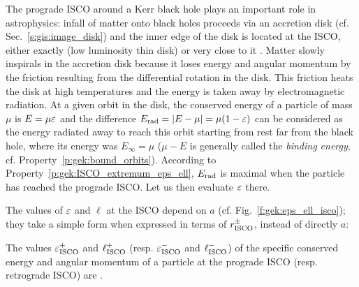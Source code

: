 The prograde ISCO around a Kerr black hole plays an important role in astrophysics:
infall of matter onto black holes proceeds via an accretion disk (cf. Sec.~\ref{s:gis:image_disk}) and
the inner edge of the disk is located at the ISCO, either exactly (low luminosity thin disk)
or very close to it \cite{AbramF13,King23,RezzoZ13}.
Matter slowly inspirals in the accretion disk because it loses energy and angular momentum
by the friction resulting from the differential rotation in the disk. This friction heats the disk at high temperatures and the energy is taken away by electromagnetic radiation. At a given orbit in the disk,
the conserved energy of a particle of mass $\mu$ is $E = \mu \varepsilon$ and the
difference $E_{\rm rad}=|E - \mu|=\mu(1 - \varepsilon)$ can be considered as the energy radiated away to reach this
orbit starting from rest far from the
black hole, where its energy was $E_\infty=\mu$ ($\mu - E$ is generally called the
\emph{binding energy}, cf. Property~\ref{p:gek:bound_orbits}).
According to Property~\ref{p:gek:ISCO_extremum_eps_ell}, $E_{\rm rad}$
is maximal when the particle has reached the prograde ISCO. Let us then evaluate $\varepsilon$
there.

The values of $\varepsilon$ and $\ell$ at the ISCO depend on $a$ (cf. Fig.~\ref{f:gek:eps_ell_isco});
they take a simple form when expressed in terms of $r_{\rm ISCO}^\pm$, instead of directly $a$:

\begin{prop}
The values $\varepsilon_{\rm ISCO}^+$ and $\ell_{\rm ISCO}^+$
(resp. $\varepsilon_{\rm ISCO}^-$ and $\ell_{\rm ISCO}^-$) of the
specific conserved energy and angular momentum of a particle at the prograde ISCO
(resp. retrograde ISCO) are
\be \label{e:gek:veps_ell_ISCO}
    \qand
     .
\ee
\end{prop}


